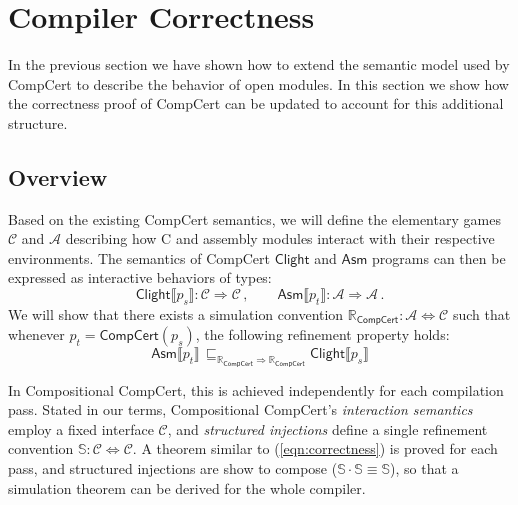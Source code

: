 \documentclass[acmsmall,timestamp,review,anonymous]{acmart}
\newcommand{\kw}[1]{\ensuremath{ \mathsf{#1} }}
\begin{document}
\begin{definition}[Hiding]

\end{definition}



\section{Compiler Correctness} \label{sec:compcert} %

In the previous section
we have shown how to extend
the semantic model used by CompCert
to describe the behavior of open modules.
In this section
we show how the correctness proof of CompCert
can be updated to account for this additional structure.

\subsection{Overview} \label{sec:compcert:overview} %

Based on the existing CompCert semantics,
we will define the elementary games
$\mathcal{C}$ and $\mathcal{A}$
describing how C and assembly modules
interact with their respective environments.
The semantics of CompCert $\kw{Clight}$ and $\kw{Asm}$ programs
can then be expressed as interactive behaviors of types:
\[
    \kw{Clight} \llbracket p_s \rrbracket :
      \mathcal{C} \Rightarrow \mathcal{C} \,, \qquad
    \kw{Asm} \llbracket p_t \rrbracket :
      \mathcal{A} \Rightarrow \mathcal{A} \,.
\]
We will show that there exists a simulation convention
$\mathbb{R}_\kw{CompCert} : \mathcal{A} \Leftrightarrow \mathcal{C}$
such that whenever $p_t = \kw{CompCert}(p_s)$,
the following refinement property holds:
\begin{equation}
    \label{eqn:correctness}
    \kw{Asm} \llbracket p_t \rrbracket \,
    \sqsubseteq_{\mathbb{R}_\kw{CompCert} \Rightarrow \mathbb{R}_\kw{CompCert}}
    \kw{Clight} \llbracket p_s \rrbracket
\end{equation}

In Compositional CompCert,
this is achieved independently for each compilation pass.
Stated in our terms,
Compositional CompCert's \emph{interaction semantics}
employ a fixed interface $\mathcal{C}$,
and \emph{structured injections} define a single refinement convention
$\mathbb{S} : \mathcal{C} \Leftrightarrow \mathcal{C}$.
A theorem similar to (\ref{eqn:correctness}) is proved for each pass,
and structured injections are show to compose
($\mathbb{S} \cdot \mathbb{S} \equiv \mathbb{S}$),
so that a simulation theorem can be derived for the whole compiler.
\end{document}
